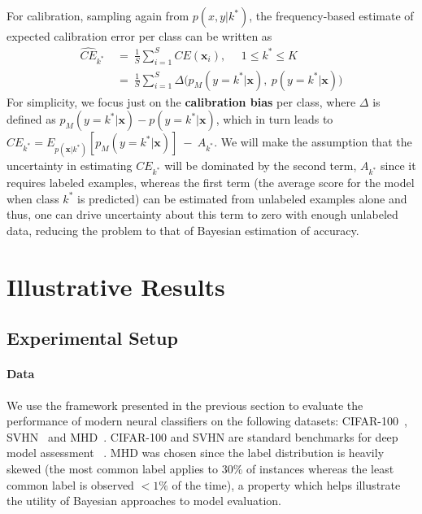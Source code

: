 \documentclass{article}
\newcommand{\ux}{{\mathbf{x}}}
\newcommand{\robby}[1]{\textcolor{Red}{[#1]\textsubscript{Robby}}}
\begin{document}
For calibration, %
sampling again from  $p(x,y | k^*)$,
the frequency-based estimate of expected calibration error per class can be written as
\begin{align*}
\hat{CE}_{k^*} & \ = \  \frac{1}{S} \sum_{i=1}^S CE(\ux_i), \ \  \ \ \ \ 1 \le k^* \le K \\
 &  \ = \  \frac{1}{S} \sum_{i=1}^S \Delta\bigl(p_M(y = k^*| \ux), \  p(y =k^*| \ux)  \bigr)
\end{align*}
For simplicity, we focus just on the {\bf calibration bias}  per class, where  $\Delta$ is defined as $p_M(y = k^*| \ux) - p(y =k^*| \ux)$, which in turn leads to
$CE_{k^*} = %
E_{p(\ux|k^*)}[ p_M(y = k^*| \ux)] \ - \  {A}_{k^*} $.
We will make the assumption that the uncertainty in estimating $CE_{k^*}$ will be dominated by the second term, ${A}_{k^*}$ since it requires labeled examples, whereas the first term (the average score for the model when class $k^*$ is predicted) can be estimated from unlabeled examples alone and thus, one can drive uncertainty about this term to zero with enough unlabeled data, reducing the problem to that of Bayesian estimation of accuracy.





\section{Illustrative Results}


\subsection{Experimental Setup}

\paragraph{Data}
We use the framework presented in the previous section to evaluate the performance of modern neural classifiers on the following datasets:
    CIFAR-100~\cite{krizhevsky2009learning},
    SVHN~\cite{netzer2011reading} and
    MHD~\cite{tai_seale2016mhd}.
CIFAR-100 and SVHN are standard benchmarks for deep model assessment ~\cite{guo2017calibration, hendrycks2019benchmarking}.
MHD was chosen since the label distribution is heavily skewed (the most common label applies to $30\%$ of instances whereas the least common label is observed $<1\%$ of the time), a property which helps illustrate the utility of Bayesian approaches to model evaluation.
\end{document}

